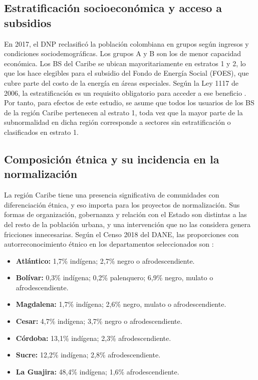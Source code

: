 \subsection{Estratificación socioeconómica y acceso a subsidios}
\label{subsec:estratificacion}

En 2017, el DNP reclasificó la población colombiana en grupos según ingresos y condiciones sociodemográficas. Los grupos A y B son los de menor capacidad económica. Los BS del Caribe se ubican mayoritariamente en estratos 1 y 2, lo que los hace elegibles para el subsidio del Fondo de Energía Social (FOES), que cubre parte del costo de la energía en áreas especiales. Según la Ley 1117 de 2006, la estratificación es un requisito obligatorio para acceder a ese beneficio \parencite{Ley1117_2006}. Por tanto, para efectos de este estudio, se asume que todos los usuarios de los BS de la región Caribe pertenecen al estrato 1, toda vez que la mayor parte de la subnormalidad en dicha región corresponde a sectores sin estratificación o clasificados en estrato 1.

\subsection{Composición étnica y su incidencia en la normalización}
\label{subsec:etnica}

La región Caribe tiene una presencia significativa de comunidades con diferenciación étnica, y eso importa para los proyectos de normalización. Sus formas de organización, gobernanza y relación con el Estado son distintas a las del resto de la población urbana, y una intervención que no las considera genera fricciones innecesarias. Según el Censo 2018 del DANE, las proporciones con autorreconocimiento étnico en los departamentos seleccionados son \parencite{DANE2018}:

\begin{itemize}
    \item \textbf{Atlántico:} 1,7\% indígena; 2,7\% negro o afrodescendiente.
    \item \textbf{Bolívar:} 0,3\% indígena; 0,2\% palenquero; 6,9\% negro, mulato o afrodescendiente.
    \item \textbf{Magdalena:} 1,7\% indígena; 2,6\% negro, mulato o afrodescendiente.
    \item \textbf{Cesar:} 4,7\% indígena; 3,7\% negro o afrodescendiente.
    \item \textbf{Córdoba:} 13,1\% indígena; 2,3\% afrodescendiente.
    \item \textbf{Sucre:} 12,2\% indígena; 2,8\% afrodescendiente.
    \item \textbf{La Guajira:} 48,4\% indígena; 1,6\% afrodescendiente.
\end{itemize}

